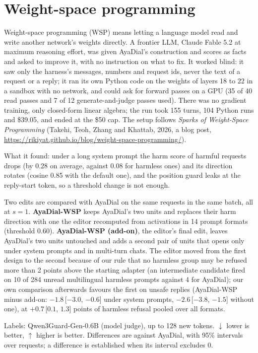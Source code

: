 \documentclass[10pt,a4paper]{article}
\begin{document}
\section{Weight-space programming}\label{sec:wsp}
Weight-space programming (WSP) means letting a language model read and write another network's weights directly. A frontier LLM, Claude Fable 5.2 at maximum reasoning effort, was given AyaDial's construction and scores as facts and asked to improve it, with no instruction on what to fix. It worked blind: it saw only the harness's messages, numbers and request ids, never the text of a request or a reply; it ran its own Python code on the weights of layers 18 to 22 in a sandbox with no network, and could ask for forward passes on a GPU (35 of 40 read passes and 7 of 12 generate-and-judge passes used). There was no gradient training, only closed-form linear algebra; the run took 155 turns, 104 Python runs and \$39.05, and ended at the \$50 cap. The setup follows \emph{Sparks of Weight-Space Programming} (Takehi, Teoh, Zhang and Khattab, 2026, a blog post, \url{https://rikiyat.github.io/blog/weight-space-programming/}).

What it found: under a long system prompt the harm score of harmful requests drops (by 0.28 on average, against 0.08 for harmless ones) and its direction rotates (cosine 0.85 with the default one), and the position guard leaks at the reply-start token, so a threshold change is not enough.

Two edits are compared with AyaDial on the same requests in the same batch, all at $s = 1$. \textbf{AyaDial-WSP} keeps AyaDial's two units and replaces their harm direction with one the editor recomputed from activations in 14 prompt formats (threshold 0.60). \textbf{AyaDial-WSP (add-on)}, the editor's final edit, leaves AyaDial's two units untouched and adds a second pair of units that opens only under system prompts and in multi-turn chats. The editor moved from the first design to the second because of our rule that no harmless group may be refused more than 2 points above the starting adapter (an intermediate candidate fired on 10 of 284 unread multilingual harmless prompts against 4 for AyaDial); our own comparison afterwards favours the first on unsafe replies (AyaDial-WSP minus add-on: $-1.8$\,[$-3.0$, $-0.6$] under system prompts, $-2.6$\,[$-3.8$, $-1.5$] without one), at $+0.7$\,[$0.1$, $1.3$] points of harmless refusal pooled over all formats.

Labels: Qwen3Guard-Gen-0.6B (model judge), up to 128 new tokens. $\downarrow$ lower is better, $\uparrow$ higher is better. Differences are against AyaDial, with 95\% intervals over requests; a difference is established when its interval excludes 0.
\end{document}
